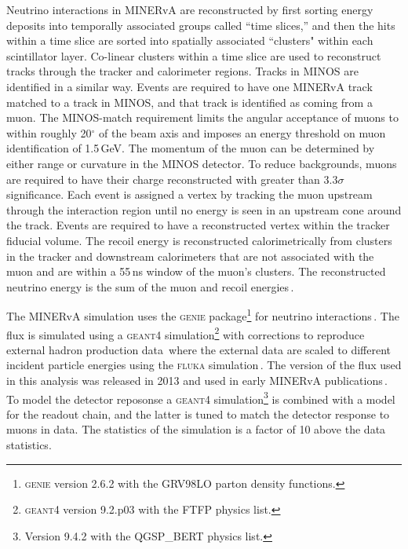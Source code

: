 \documentclass[%
reprint,
% 
superscriptaddress,
showpacs,
preprintnumbers,
showkeys,
nofootinbib,
 amsmath,amssymb,
 aps,
 prd,
floatfix,
]{revtex4-1}
\newcommand\minerva  {MINERvA\xspace}
\newcommand\GENIE  {\textsc{genie}\xspace}
\newcommand\GEANT  {\textsc{geant4}\xspace}
\newcommand\FLUKA  {\textsc{fluka}\xspace}
\begin{document}
Neutrino interactions in \minerva are reconstructed by first sorting energy deposits into temporally associated groups called ``time slices,'' and then the hits within a time slice are sorted into spatially associated ``clusters" within each scintillator layer. Co-linear clusters within a time slice are used to reconstruct tracks through the tracker and calorimeter regions. Tracks in MINOS are identified in a similar way. Events are required to have one \minerva track matched to a track in MINOS, and that track is identified as coming from a muon. The MINOS-match requirement limits the angular acceptance of muons to within roughly 20$^{\circ}$ of the beam axis and imposes an energy threshold on muon identification of 1.5\,GeV. The momentum of the muon can be determined by either range or curvature in the MINOS detector. To reduce backgrounds, muons are required to have their charge reconstructed with greater than $3.3\sigma$ significance. Each event is assigned a vertex by tracking the muon upstream through the interaction region until no energy is seen in an upstream cone around the track. Events are required to have a reconstructed vertex within the tracker fiducial volume. The recoil energy is reconstructed calorimetrically from clusters in the tracker and downstream calorimeters that are not associated with the muon and are within a 55\,ns window of the muon's clusters. The reconstructed neutrino energy is the sum of the muon and recoil energies\,\cite{MINERvA-NIM}. 

The MINERvA simulation uses the \GENIE package\footnote{\GENIE version 2.6.2 with the GRV98LO parton density functions.} for neutrino interactions\,\cite{GENIE}. The flux is simulated using a \GEANT simulation\footnote{\GEANT version 9.2.p03 with the FTFP physics list.} with corrections to reproduce external hadron production  data\,\cite{NA49a,NA49b,Barton,Denisov,Allaby,Carroll,shine,Lebedev-thesis,tinti-thesis} where the external data are scaled to different incident particle energies using the \FLUKA simulation\,\cite{FLUKA1,FLUKA2}. The version of the flux
used in this analysis was released in 2013 and used in early MINERvA publications\,\cite{minerva-nu-e-flux,Leo-thesis}.
To model the detector reposonse a \GEANT simulation\footnote{Version 9.4.2 with the \textsc{QGSP\_BERT} physics list.} is combined with a model for the readout chain, and the latter is tuned to match the detector response to muons in data.  The statistics of the simulation is a factor of 10 above the data statistics. 
\end{document}
